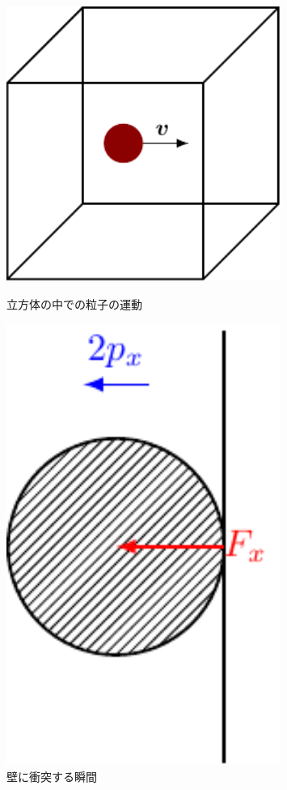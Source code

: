 \documentclass[unicode,a4paper,10pt]{ltjsarticle}
\begin{document}
\begin{enumerate}
        \begin{figure}[ht]
          \centering
          \begin{minipage}{0.4\textwidth}
            \centering
            \includegraphics[width=0.8\textwidth]{fig/fig01.pdf}
            \caption{立方体の中での粒子の運動}
          \end{minipage}
          \begin{minipage}{0.3\textwidth}
            \centering
            \includegraphics[width=0.8\textwidth]{fig/fig02.pdf}
            \caption{壁に衝突する瞬間}
          \end{minipage}
        \end{figure}


\end{enumerate}
\end{document}
